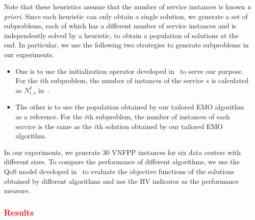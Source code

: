 {\begin{itemize}
\end{itemize}
Note that these heuristics assume that the number of service instances is known \textit{a priori}. Since each heuristic can only obtain a single solution, we generate a set of subproblems, each of which has a different number of service instances and is independently solved by a heuristic, to obtain a population of solutions at the end. In particular, we use the following two strategies to generate subproblems in our experiments.
\begin{itemize}
    \item One is to use the initialization operator developed in~ to serve our purpose. For the $i$th subproblem, the number of instances of the service $s$ is calculated as $N^I_{i,s}$ in~.
    \item The other is to use the population obtained by our tailored EMO algorithm as a reference. For the $i$th subproblem, the number of instances of each service is the same as the $i$th solution obtained by our tailored EMO algorithm.
\end{itemize}
In our experiments, we generate $30$ VNFPP instances for six data centers with different sizes. To compare the performance of different algorithms, we use the QoS model developed in~ to evaluate the objective functions of the solutions obtained by different algorithms and use the HV indicator as the performance measure.
}
\textcolor{red}{
\subsubsection{Results}
}

